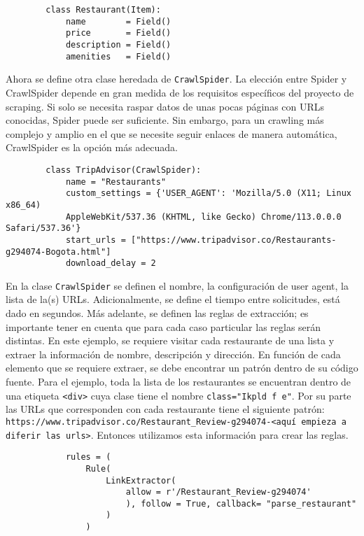         \begin{verbatim}
        class Restaurant(Item):
            name        = Field()
            price       = Field()
            description = Field()
            amenities   = Field()
        \end{verbatim}

        Ahora se define otra clase heredada de \texttt{CrawlSpider}. La elección entre Spider y CrawlSpider depende en gran medida de los requisitos específicos del proyecto de scraping. Si solo se necesita raspar datos de unas pocas páginas con URLs conocidas, Spider puede ser suficiente. Sin embargo, para un crawling más complejo y amplio en el que se necesite seguir enlaces de manera automática, CrawlSpider es la opción más adecuada.

        \begin{verbatim}
        class TripAdvisor(CrawlSpider):
            name = "Restaurants"
            custom_settings = {'USER_AGENT': 'Mozilla/5.0 (X11; Linux x86_64) 
            AppleWebKit/537.36 (KHTML, like Gecko) Chrome/113.0.0.0 Safari/537.36'}
            start_urls = ["https://www.tripadvisor.co/Restaurants-g294074-Bogota.html"]
            download_delay = 2
        \end{verbatim}

        En la clase \texttt{CrawlSpider} se definen el nombre, la configuración de user agent, la lista de la(s) URLs. Adicionalmente, se define el tiempo entre solicitudes, está dado en segundos. Más adelante, se definen las reglas de extracción; es importante tener en cuenta que para cada caso particular las reglas serán distintas. En este ejemplo, se requiere visitar cada restaurante de una lista y extraer la información de nombre, descripción y dirección. En función de cada elemento que se requiere extraer, se debe encontrar un patrón dentro de su código fuente. Para el ejemplo, toda la lista de los restaurantes se encuentran dentro de una etiqueta \texttt{<div>} cuya clase tiene el nombre \texttt{class="Ikpld f e"}. Por su parte las URLs que corresponden con cada restaurante tiene el siguiente patrón: \texttt{https://www.tripadvisor.co/Restaurant\_Review-g294074-<aquí empieza a diferir las urls>}. Entonces utilizamos esta información para crear las reglas.

        \begin{verbatim}
            rules = (
                Rule(
                    LinkExtractor(
                        allow = r'/Restaurant_Review-g294074'
                        ), follow = True, callback= "parse_restaurant"
                    )
                )
        \end{verbatim}

